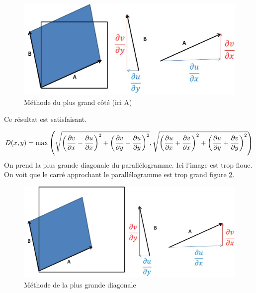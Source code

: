\begin{figure}[h!]
\centering
\includegraphics[scale=0.5]{methode_plus_grand_cote.jpg}
\caption{Méthode du plus grand côté (ici A)}
\label{methode_plus_grand_cote}
\end{figure}


Ce résultat est satisfaisant.


$$D(x,y) = \max \left( \sqrt{\left(\frac{\partial v}{\partial x}-\frac{\partial  u}{\partial  x}\right)^2+\left(\frac{\partial v}{\partial y}-\frac{\partial  u}{\partial y}\right)^2}, \sqrt{\left(\frac{\partial u}{\partial x}+\frac{\partial  v}{\partial  x}\right)^2+\left(\frac{\partial u}{\partial y}+\frac{\partial  v}{\partial  y}\right)^2} \right)$$
On prend la plus grande diagonale du parallélogramme. Ici l'image est trop floue. On voit que le carré approchant le parallélogramme est trop grand figure \ref{methode_grande_diagonale}.

\begin{figure}[h!]
\centering
\includegraphics[scale=0.5]{methode_grande_diagonale.jpg}
\caption{Méthode de la plus grande diagonale}
\label{methode_grande_diagonale}
\end{figure}



